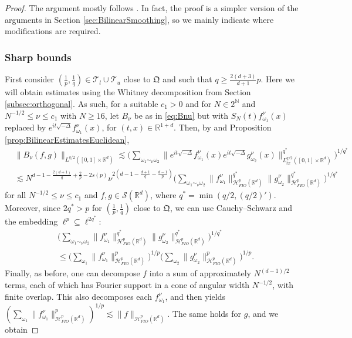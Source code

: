 \documentclass{amsart}
\numberwithin{equation}{section}
\theoremstyle{definition}
\newcommand{\R}{\mathbb{R}}
\newcommand{\Rd}{\mathbb{R}^{d}}
\newcommand{\N}{\mathbb{N}}
\newcommand {\Hp}{\mathcal{H}^{p}_{FIO}(\R^d)}
\newcommand {\Sw}{\mathcal{S}}
\newcommand {\w}{\omega}
\begin{document}
\begin{proof}
The argument mostly follows \cite{TaoVargas2000}. In fact, the proof is a simpler version of the arguments in Section \ref{sec:BilinearSmoothing}, so we mainly indicate where modifications are required. 

\subsubsection*{Sharp bounds}

First consider $(\frac{1}{p},\frac{1}{q})\in \mathcal{T}_{l}\cup \mathcal{T}_{u}$ close to $\mathfrak{Q}$ and such that $q\geq \frac{2(d+3)}{d+1}p$. Here we will obtain estimates using the Whitney decomposition from Section \ref{subsec:orthogonal}. As such, for a suitable $c_{1}>0$ and for $N\in 2^{\N}$ and $N^{-1/2}\leq \nu\leq c_{1}$ with $N\geq 16$, let $B_{\nu}$ be as in \eqref{eq:Bnu} but with $S_{N}(t)f^{\nu}_{\w_{1}}(x)$ replaced by $e^{it\sqrt{-\Delta}}f^{\nu}_{\w_{1}}(x)$, for $(t,x)\in\R^{1+d}$.  Then, by \cite[Lemma 7.1]{TaoVargas2000} and Proposition \ref{prop:BilinearEstimatesEuclidean}, 
\begin{align*}
&\|B_{\nu}(f,g)\|_{L^{q/2}([0,1]\times\Rd)}\lesssim \Big(\sum_{\w_{1}\sim_{\nu}\w_{2}}\|e^{it\sqrt{-\Delta}}f^{\nu}_{\w_{1}}(x)e^{it\sqrt{-\Delta}}g^{\nu}_{\w_{2}}(x)\|_{L^{q/2}_{tx}([0,1]\times\Rd)}^{q^{*}}\Big)^{1/q^{*}}\\
&\lesssim N^{d-1-\frac{2(d+1)}{q}+\frac{2}{p}-2s(p)} \nu^{2(d-1-\frac{d+1}{q}-\frac{d-1}{p})}\Big(\sum_{\w_{1}\sim_{\nu}\w_{2}}\|f^{\nu}_{\w_{1}}\|_{\Hp}^{q^{*}}\|g^{\nu}_{\w_{2}}\|_{\Hp}^{q^{*}}\Big)^{1/q^{*}}
\end{align*}
for all $N^{-1/2}\leq \nu\leq c_{1}$ and $f,g\in\Sw(\Rd)$, where $q^{*}=\min(q/2,(q/2)')$. Moreover, since $2q^{*}>p$ for $(\frac{1}{p},\frac{1}{q})$ close to $\mathfrak{Q}$, we can use Cauchy--Schwarz and the embedding $\ell^{p}\subseteq\ell^{2q^{*}}$:
\begin{align*}
&\Big(\sum_{\w_{1}\sim_{\nu}\w_{2}}\|f^{\nu}_{\w_{1}}\|_{\Hp}^{q^{*}}\|g^{\nu}_{\w_{2}}\|_{\Hp}^{q^{*}}\Big)^{1/q^{*}}\\
&\leq \Big(\sum_{\w_{1}}\|f^{\nu}_{\w_{1}}\|_{\Hp}^{p}\Big)^{1/p}\Big(\sum_{\w_{2}}\|g^{\nu}_{\w_{2}}\|_{\Hp}^{p}\Big)^{1/p}.
\end{align*}
Finally, as before, one can decompose $f$ into a sum of approximately $N^{(d-1)/2}$ terms, each of which has Fourier support in a cone of angular width $N^{-1/2}$, with finite overlap. This also decomposes each $f^{\nu}_{\w_{1}}$, and then \cite[Proposition 7.1]{HaPoRoYu26} yields $(\sum_{\w_{1}}\|f^{\nu}_{\w_{1}}\|_{\Hp}^{p})^{1/p}\lesssim \|f\|_{\Hp}$. The same holds for $g$, and we obtain

\end{proof}
\end{document}
